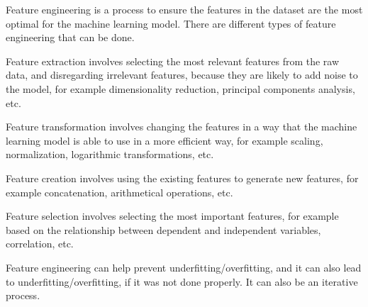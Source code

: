 \documentclass{article}
\begin{document}
Feature engineering is a process to ensure the features in the dataset are the most optimal for the machine learning model. There are different types of feature engineering that can be done.

Feature extraction involves selecting the most relevant features from the raw data, and disregarding irrelevant features, because they are likely to add noise to the model, for example dimensionality reduction, principal components analysis, etc.

Feature transformation involves changing the features in a way that the machine learning model is able to use in a more efficient way, for example scaling, normalization, logarithmic transformations, etc.

Feature creation involves using the existing features to generate new features, for example concatenation, arithmetical operations, etc.

Feature selection involves selecting the most important features, for example based on the relationship between dependent and independent variables, correlation, etc.

Feature engineering can help prevent underfitting/overfitting, and it can also lead to underfitting/overfitting, if it was not done properly. It can also be an iterative process.
\end{document}
